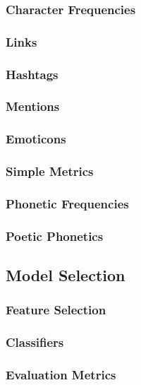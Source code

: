 \documentclass[11pt]{article}
\begin{document}
\subsubsection{Character Frequencies}

\subsubsection{Links}

\subsubsection{Hashtags}

\subsubsection{Mentions}

\subsubsection{Emoticons}

\subsubsection{Simple Metrics}

\subsubsection{Phonetic Frequencies}

\subsubsection{Poetic Phonetics}

\subsection{Model Selection}

\subsubsection{Feature Selection}

\subsubsection{Classifiers}

\subsubsection{Evaluation Metrics}
\end{document}
